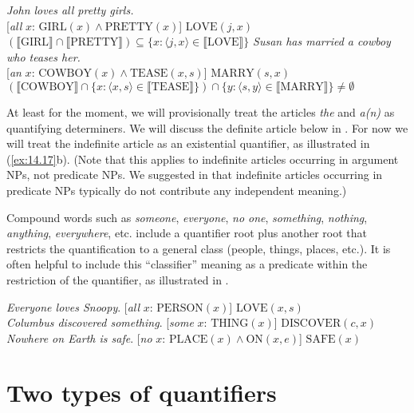 \ea \label{ex:14.17}
\ea \textit{John loves all pretty girls.}\\
{}[\textit{all} $x$: $\text{GIRL}(x) \wedge \text{PRETTY}(x)$] $\text{LOVE}(j,x)$\\
$(\llbracket \text{GIRL} \rrbracket \cap \llbracket \text{PRETTY} \rrbracket) \subseteq  \{x: \langle j,x\rangle  \in \llbracket \text{LOVE} \rrbracket \}$
\ex \textit{Susan has married a cowboy who teases her.}\\
{}[\textit{an} $x$: $\text{COWBOY}(x) \wedge \text{TEASE}(x,s)$] $\text{MARRY}(s,x)$\\
$(\llbracket \text{COWBOY} \rrbracket \cap \{x: \langle x,s \rangle \in  \llbracket \text{TEASE} \rrbracket \}) \cap  \{y: \langle s,y \rangle  \in \llbracket \text{MARRY} \rrbracket  \} \neq \emptyset$ 
\z \z


At least for the moment, we will provisionally treat the articles \textit{the} and \textit{a(n)} as quantifying determiners. We will discuss the definite article below in . For now we will treat the indefinite article as an existential quantifier, as illustrated in (\ref{ex:14.17}b). (Note that this applies to indefinite articles occurring in argument NPs, not predicate NPs. We suggested in  that indefinite articles occurring in predicate NPs typically do not contribute any independent meaning.)



Compound words such as \textit{someone}, \textit{everyone}, \textit{no one}, \textit{something}, \textit{nothing}, \textit{anything}, \textit{everywhere}, etc. include a quantifier root plus another root that restricts the quantification to a general class (people, things, places, etc.). It is often helpful to include this “classifier” meaning as a predicate within the restriction of the quantifier, as illustrated in .


\ea \label{ex:14.18}
\ea \textit{Everyone loves Snoopy}.         \hfill  [\textit{all} $x$: $\text{PERSON}(x)$] $\text{LOVE}(x,s)$\\
\ex \textit{Columbus discovered something}. \hfill [\textit{some} $x$: $\text{THING}(x)$] $\text{DISCOVER}(c,x)$\\
\ex \textit{Nowhere on Earth is safe}.      \hfill [\textit{no} $x$: $\text{PLACE}(x) \wedge \text{ON}(x,e)$] $\text{SAFE}(x)$
                       \z
\z

\section{Two types of quantifiers}\label{sec:14.4}

